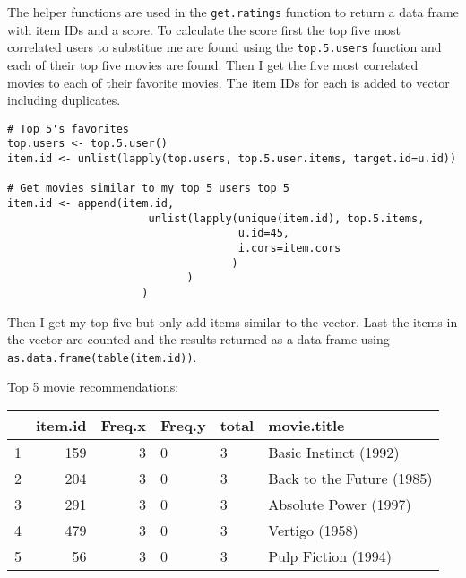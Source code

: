 \documentclass[12pt, a4paper]{article}
\newcommand{\code}[1]{\texttt{#1}}
\begin{document}
\newpage
The helper functions are used in the \code{get.ratings} function to return a data frame with item IDs and a score. To calculate the score first the top five most correlated users to substitue me are found using the \code{top.5.users} function and each of their top five movies are found. Then I get the five most correlated movies to each of their favorite movies. The item IDs for each is added to vector including duplicates.

\begin{minipage}{\linewidth} %
\vspace{2em}
\begin{verbatim}
# Top 5's favorites
top.users <- top.5.user()
item.id <- unlist(lapply(top.users, top.5.user.items, target.id=u.id))

# Get movies similar to my top 5 users top 5
item.id <- append(item.id,
                      unlist(lapply(unique(item.id), top.5.items, 
                                    u.id=45, 
                                    i.cors=item.cors
                                   )
                            )
                     )
\end{verbatim}
\vspace{2em}
\end{minipage}
    
Then I get my top five but only add items similar to the vector. Last the items in the vector are counted and the results returned as a data frame using \code{as.data.frame(table(item.id))}.

\newpage
Top 5 movie recommendations:

\begin{minipage}{\linewidth} %
\vspace{2em}
\centering
\begin{tabular}{|l|r|r|l|l|l|}
    \hline
      & item.id & Freq.x & Freq.y & total & movie.title\\
    \hline
    1 & 159 & 3 & 0 & 3 & Basic Instinct (1992)\\
    \hline
    2 & 204 & 3 & 0 & 3 & Back to the Future (1985)\\
    \hline
    3 & 291 & 3 & 0 & 3 & Absolute Power (1997)\\
    \hline
    4 & 479 & 3 & 0 & 3 & Vertigo (1958)\\
    \hline
    5 & 56 & 3 & 0 & 3 & Pulp Fiction (1994)\\
    \hline
\end{tabular}
\vspace{2em}
\end{minipage}
\end{document}
